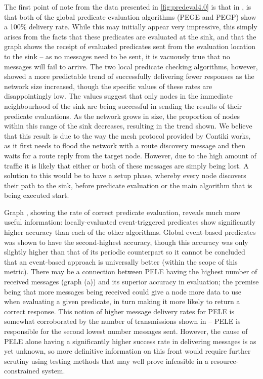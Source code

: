 The first point of note from the data presented in \autoref{fig:predeval4.0} is that in , is that both of the global predicate evaluation algorithms (PEGE and PEGP) show a 100\% delivery rate. While this may initially appear very impressive, this simply arises from the facts that these predicates are evaluated at the sink, and that the graph shows the receipt of evaluated predicates sent from the evaluation location to the sink -- as no messages need to be sent, it is vacuously true that no messages will fail to arrive. The two local predicate checking algorithms, however, showed a more predictable trend of successfully delivering fewer responses as the network size increased, though the specific values of these rates are disappointingly low. The values suggest that only nodes in the immediate neighbourhood of the sink are being successful in sending the results of their predicate evaluations. As the network grows in size, the proportion of nodes within this range of the sink decreases, resulting in the trend shown. We believe that this result is due to the way the mesh protocol provided by Contiki works, as it first needs to flood the network with a route discovery message and then waits for a route reply from the target node. However, due to the high amount of traffic it is likely that either or both of these messages are simply being lost. A solution to this would be to have a setup phase, whereby every node discovers their path to the sink, before predicate evaluation or the main algorithm that is being executed start.

Graph , showing the rate of correct predicate evaluation, reveals much more useful information: locally-evaluated event-triggered predicates show significantly higher accuracy than each of the other algorithms. Global event-based predicates was shown to have the second-highest accuracy, though this accuracy was only slightly higher than that of its periodic counterpart so it cannot be concluded that an event-based approach is universally better (within the scope of this metric). There may be a connection between PELE having the highest number of received messages (graph (a)) and its superior accuracy in evaluation; the premise being that more messages being received could give a node more data to use when evaluating a given predicate, in turn making it more likely to return a correct response. This notion of higher message delivery rates for PELE is somewhat corroborated by the number of transmissions shown in  -- PELE is responsible for the second lowest number messages sent. However, the cause of PELE alone having a significantly higher success rate in delivering messages is as yet unknown, so more definitive information on this front would require further scrutiny using testing methods that may well prove infeasible in a resource-constrained system.


